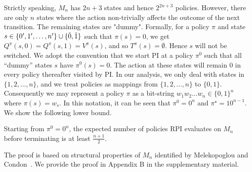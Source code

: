 Strictly speaking, $M_n$ has $2n+3$ states and hence $2^{2n+3}$ policies. However, there are only $n$ states where the action non-trivially affects the outcome of the next transition. The remaining states are "dummy". Formally, for a policy $\pi$ and state $s\in \{ 0^{\prime}, 1^{\prime}, \dots, n^{\prime}\} \cup \{\Tilde{0}, \Tilde{1}\}$ such that $\pi(s)=0$, we get $Q^{\pi}(s,0)=Q^{\pi}(s,1)=V^{\pi}(s)$, and so $T^{\pi}(s) = \emptyset$. Hence $s$ will not be switched. We adopt the convention that we start PI at a policy $\pi^0$ such that all ``dummy'' states $s$ have $\pi^0(s)=0$. The action at these states will remain $0$ in every policy thereafter visited by PI. In our analysis, we only deal with states in $\{1, 2, \dots, n\}$, and we treat policies as mappings from $\{1, 2, \dots, n\}$ to $\{0, 1\}$. Consequently we may represent a policy $\pi$ as a bit-string $w_1w_2{\dots}w_n \in \{0,1\}^n$ where $\pi(s)=w_s$. In this notation, it can be seen that $\pi^0 = 0^n$ and $\pi^{\star} = 10^{n-1}$. We show the following lower bound.
\begin{theorem}
\label{thm:lowerbound}
	Starting from $\pi^0=0^n$, the expected number of policies RPI evaluates on $M_n$ before terminating is at least $\frac{n+1}{2}$.
\end{theorem}
The proof is based on structural properties of $M_{n}$ identified by Melekopoglou and Condon~. We provide the proof in Appendix B in the supplementary material.




